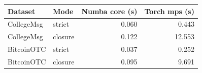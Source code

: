 \begin{tabular*}{\columnwidth}{@{\extracolsep{\fill}}llrr@{}}
\toprule
Dataset & Mode & Numba core (s) & Torch mps (s) \\
\midrule
CollegeMsg & strict & 0.060 & 0.443 \\
CollegeMsg & closure & 0.122 & 12.553 \\
BitcoinOTC & strict & 0.037 & 0.252 \\
BitcoinOTC & closure & 0.095 & 9.691 \\
\bottomrule
\end{tabular*}

